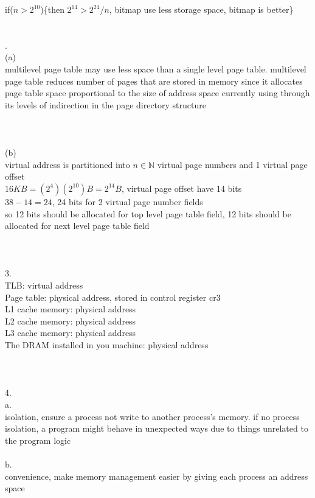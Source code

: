 \documentclass[12pt, border = 4pt, multi]{article} %
\begin{document}
if($n > 2 ^ {10}$)\{then $2 ^ {14} > 2 ^ {24} / n$, bitmap use less storage space, bitmap is better\}\\
\\
\\
\newpage
{}.\\
(a)\\
multilevel page table may use less space than a single level page table. multilevel page table reduces number of pages that are stored in memory since it allocates page table space proportional to the size of address space currently using through its levels of indirection in the page directory structure\\
\\
\\
\\
(b)\\
virtual address is partitioned into $n \in \mathbb{N}$ virtual page numbers and 1 virtual page offset\\
$16KB = (2 ^ 4)(2 ^ {10})B = 2 ^ {14}B$, virtual page offset have 14 bits\\
$38 - 14 = 24$, 24 bits for 2 virtual page number fields\\
so 12 bits should be allocated for top level page table field, 12 bits should be allocated for next level page table field\\
\\
\\
\\
3.\\
TLB: virtual address\\
Page table: physical address, stored in control register cr3\\
L1 cache memory: physical address\\
L2 cache memory: physical address\\
L3 cache memory: physical address\\
The DRAM installed in you machine: physical address\\
\\
\\
\\
4.\\
a.\\
isolation, ensure a process not write to another process's memory. if no process isolation, a program might behave in unexpected ways due to things unrelated to the program logic\\
\\
b.\\
convenience, make memory management easier by giving each process an address space\\
\end{document}
